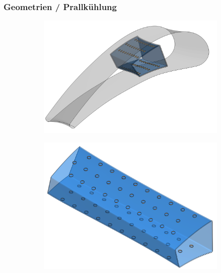 \documentclass[8pt, aspectratio=169]{beamer}
\begin{document}
\begin{frame}
	\frametitle{Geometrien / Prallkühlung}
	\vspace{-1.5cm}\hspace{-0.5cm}
	\begin{figure}[H]
		\centering
		\begin{subfigure}{.3\textwidth}
			\includegraphics[width=\textwidth]{../../tec/impingement/00.png}
		\end{subfigure}
		\begin{subfigure}{.3\textwidth}
			\includegraphics[width=\textwidth]{../../tec/impingement/02.png}
		\end{subfigure}
		\begin{subfigure}{.3\textwidth}

\end{subfigure}
\end{figure}
\end{frame}
\end{document}
